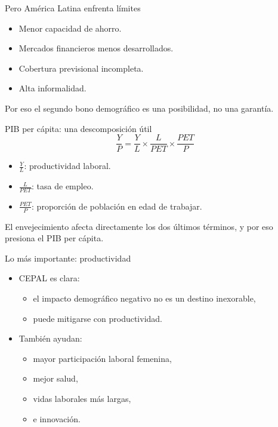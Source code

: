 \documentclass{beamer}
\begin{document}
\begin{frame}{Pero América Latina enfrenta límites}
\begin{itemize}
    \item Menor capacidad de ahorro.
    \item Mercados financieros menos desarrollados.
    \item Cobertura previsional incompleta.
    \item Alta informalidad.
\end{itemize}

\vspace{0.3cm}
Por eso el segundo bono demográfico es una posibilidad, no una garantía.
\end{frame}

\begin{frame}{PIB per cápita: una descomposición útil}
\[
\frac{Y}{P}=\frac{Y}{L}\times\frac{L}{PET}\times\frac{PET}{P}
\]

\begin{itemize}
    \item $\frac{Y}{L}$: productividad laboral.
    \item $\frac{L}{PET}$: tasa de empleo.
    \item $\frac{PET}{P}$: proporción de población en edad de trabajar.
\end{itemize}

\vspace{0.3cm}
El envejecimiento afecta directamente los dos últimos términos, y por eso presiona el PIB per cápita.
\end{frame}

\begin{frame}{Lo más importante: productividad}
\begin{itemize}
    \item CEPAL es clara:
    \begin{itemize}
        \item el impacto demográfico negativo no es un destino inexorable,
        \item puede mitigarse con productividad.
    \end{itemize}
    \item También ayudan:
    \begin{itemize}
        \item mayor participación laboral femenina,
        \item mejor salud,
        \item vidas laborales más largas,
        \item e innovación.
    \end{itemize}
\end{itemize}
\end{frame}
\end{document}

